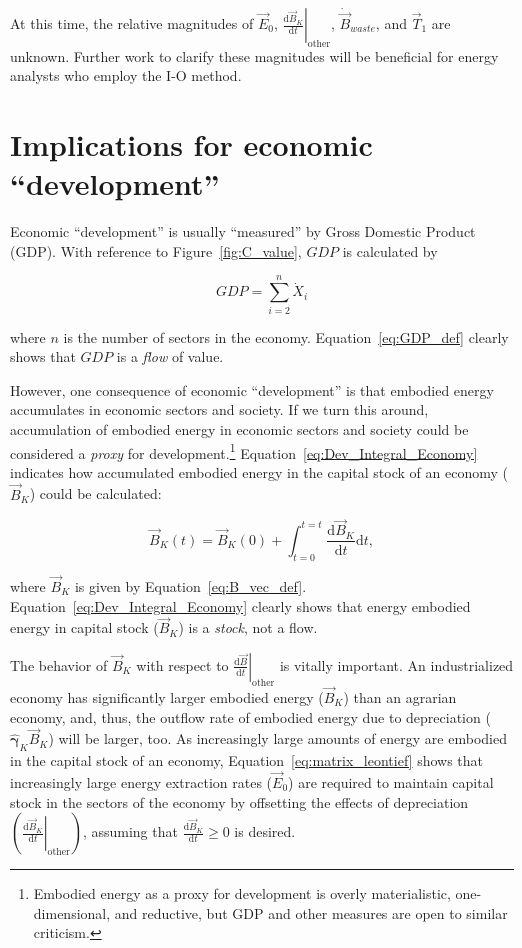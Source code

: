 At this time, the relative magnitudes of $\vec{E}_{0}$,
$\left. \frac{\mathrm{d}\vec{B}_{K}}{\mathrm{d}t} \right|_{\mathrm{other}}$,
$\dot{\vec{B}}_{waste}$, and $\vec{T}_{1}$ are unknown. 
Further work to clarify these magnitudes will be beneficial
for energy analysts who employ the I-O method.


\section{Implications for economic ``development''}
\label{sec:implications_for_development}

Economic ``development'' is usually ``measured''
by Gross Domestic Product (GDP).
With reference to Figure~\ref{fig:C_value}, $GDP$ is calculated by

\begin{equation} \label{eq:GDP_def}
	GDP
	= \sum\limits_{i=2}^{n} \dot{X}_{i}
\end{equation}

\noindent{}where $n$ is the number of sectors in the economy.
Equation~\ref{eq:GDP_def} clearly shows that 
$GDP$ is a \emph{flow} of value.

However, one consequence of economic ``development'' 
is that embodied energy accumulates 
in economic sectors and society. 
If we turn this around, 
accumulation of embodied energy in economic sectors and society 
could be considered a \emph{proxy} for development.\footnote{Embodied energy 
as a proxy for development is overly materialistic, 
one-dimensional, and reductive, 
but GDP and other measures are open to similar criticism.}
Equation~\ref{eq:Dev_Integral_Economy} indicates how accumulated
embodied energy in the capital stock 
of an economy ($\vec{B}_{K}$) could be calculated:

\begin{equation} \label{eq:Dev_Integral_Economy}
	\vec{B}_{K}(t) 
	= \vec{B}_{K}(0) 
	+ \int_{t=0}^{t=t} \frac{\mathrm{d}\vec{B}_{K}}{\mathrm{d}t}\mathrm{d}t,
\end{equation}

\noindent{}where $\vec{B}_{K}$ is given by Equation~\ref{eq:B_vec_def}.
Equation~\ref{eq:Dev_Integral_Economy} clearly shows
that energy embodied energy in capital stock ($\vec{B}_{K}$) 
is a \emph{stock}, not a flow.

The behavior of $\vec{B}_{K}$ with respect to
$\left. \frac{\mathrm{d}\vec{B}}{\mathrm{d}t} \right|_{\mathrm{other}}$ 
is vitally important. 
An industrialized economy has significantly larger embodied energy ($\vec{B}_{K}$) 
than an agrarian economy, and, thus, 
the outflow rate of embodied energy 
due to depreciation ($\hat{\bm{\gamma}}_{K}\vec{B}_{K}$) will be larger, too. 
As increasingly large amounts of energy are embodied 
in the capital stock of an economy, 
Equation~\ref{eq:matrix_leontief} shows that
increasingly large energy extraction rates ($\vec{E}_{0}$) 
are required to maintain capital stock 
in the sectors of the economy
by offsetting the effects of depreciation 
$\left( \left. \frac{\mathrm{d}\vec{B}_{K}}{\mathrm{d}t} \right|_{\mathrm{other}} \right)$,
assuming that $\frac{\mathrm{d}\vec{B}_{K}}{\mathrm{d}t} \ge 0$ 
is desired. 

